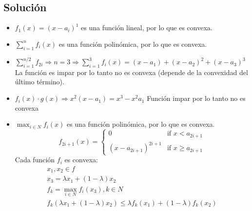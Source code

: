 \documentclass{article}
\begin{document}
\subsection*{Solución}
\begin{itemize}
    \item \(f_1(x)=(x-a_i)^1\) es una función lineal, por lo que es convexa.
    \item \(\sum_{i=1}^{n} f_i(x)\) es una función polinómica, por lo que es convexa.
    \item \(\sum_{i=1}^{n/2} f_{2i} \Rightarrow n=3\Rightarrow \sum_{i=1}^3 f_i(x)=(x-a_1)+(x-a_2)^2+(x-a_3)^3\) La función es impar por lo tanto no es convexa (depende de la convexidad del último término).
    \item \(f_i(x)\cdot g(x) \Rightarrow x^2(x-a_1) = x^3-x^2a_1\) Función impar por lo tanto no es convexa
    \item \(\max_{i\in N} f_i(x)\) es una función polinómica, por lo que es convexa.
    \[
    f_{2i+1}(x) = 
    \begin{cases}
        0 & \text{if } x < a_{2i+1} \\
        (x-a_{2i+1})^{2i+1} & \text{if } x \geq a_{2i+1}
    \end{cases}
    \]
    Cada función \(f_i\) es convexa:
    \begin{gather}
        x_1,x_2\in f\\
        x_3 = \lambda x_1 + (1-\lambda)x_2\\
        f_k=\max_{i\in N} f_i(x_3), k\in N\\
        f_k(\lambda x_1+(1-\lambda)x_2) \leq \lambda f_k(x_1) + (1-\lambda)f_k(x_2)
    \end{gather}
\end{itemize}
\end{document}
